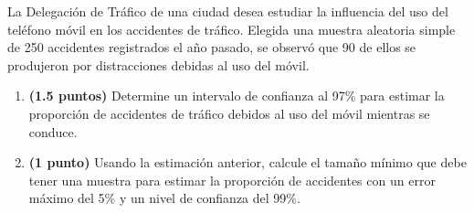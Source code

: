 
La Delegación de Tráfico de una ciudad desea estudiar la influencia del uso del teléfono móvil en los accidentes de tráfico. Elegida una muestra aleatoria simple de 250 accidentes registrados el año pasado, se observó que 90 de ellos se produjeron por distracciones debidas al uso del móvil.
\begin{enumerate}[label=\alph*)]
\item \textbf{(1.5 puntos)} Determine un intervalo de confianza al 97\% para estimar la proporción de accidentes de tráfico debidos al uso del móvil mientras se conduce.
\item \textbf{(1 punto)} Usando la estimación anterior, calcule el tamaño mínimo que debe tener una muestra para estimar la proporción de accidentes con un error máximo del 5\% y un nivel de confianza del 99\%.
\end{enumerate}
